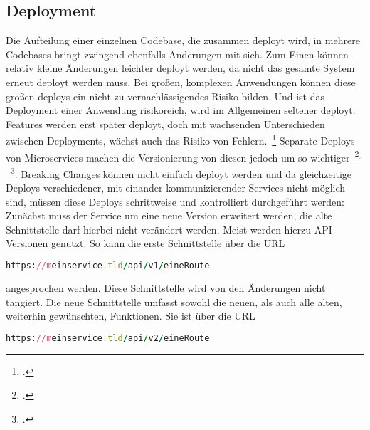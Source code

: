 \subsection{Deployment}
Die Aufteilung einer einzelnen Codebase, die zusammen deployt wird, in mehrere Codebases bringt zwingend ebenfalls Änderungen mit sich.
Zum Einen können relativ kleine Änderungen leichter deployt werden, da nicht das gesamte System erneut deployt werden muss. Bei großen, komplexen Anwendungen können diese großen deploys ein nicht zu vernachlässigendes Risiko bilden. Und ist das Deployment einer Anwendung risikoreich, wird im Allgemeinen seltener deployt. Features werden erst später deployt, doch mit wachsenden Unterschieden zwischen Deployments, wächst auch das Risiko von Fehlern.~\footcite[vgl.][Seite 6]{newman2015building}
Separate Deploys von Microservices machen die Versionierung von diesen jedoch um so wichtiger~\footcite[vgl.][Seite 62]{newman2015building}$^,$~\footcite[vgl.][]{Vergleichsartikel}. Breaking Changes können nicht einfach deployt werden und da gleichzeitige Deploys verschiedener, mit einander kommunizierender Services nicht möglich sind, müssen diese Deploys schrittweise und kontrolliert durchgeführt werden: Zunächst muss der Service um eine neue Version erweitert werden, die alte Schnittstelle darf hierbei nicht verändert werden. Meist werden hierzu API Versionen genutzt. So kann die erste Schnittstelle über die URL

\begin{lstlisting}[language=Ruby]
https://meinservice.tld/api/v1/eineRoute
\end{lstlisting}

\noindent angesprochen werden. Diese Schnittstelle wird von den Änderungen nicht tangiert. Die neue Schnittstelle umfasst sowohl die neuen, als auch alle alten, weiterhin gewünschten, Funktionen. Sie ist über die URL

\begin{lstlisting}[language=Ruby]
https://meinservice.tld/api/v2/eineRoute
\end{lstlisting}

